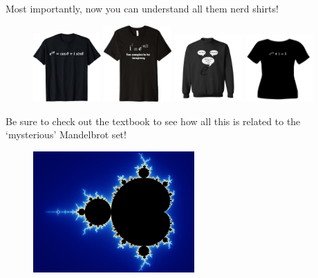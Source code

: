 \documentclass[12pt,xcolor={usenames,dvipsnames,x11names}]{beamer}
\begin{document}
\begin{frame}[t] \frametitle{} 
\footnotesize Most importantly, now you can understand all them nerd shirts!
	\begin{figure}[!ht]
	\centering
	\includegraphics[width=0.23\textwidth]{images/shirt1.png}
	\includegraphics[width=0.23\textwidth]{images/shirt2.png}
	\includegraphics[width=0.23\textwidth]{images/shirt3.png}
	\includegraphics[width=0.23\textwidth]{images/shirt4.png}
	\end{figure}

Be sure to check out the textbook to see how all this is related to the `mysterious' Mandelbrot set!
	\begin{figure}[!ht]
	\centering
	\includegraphics[width=0.55\textwidth]{images/mandelbrot.jpg}
	\end{figure}	
	
\end{frame}
\end{document}
